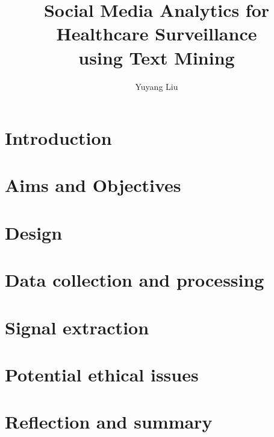 \documentclass[12pt]{report}
\begin{document}
\title{Social Media Analytics for Healthcare Surveillance \\using Text Mining}
\author{Yuyang Liu}
\normallinespacing
\maketitle

\tableofcontents %
\body
\chapter{Introduction} %

 
\chapter{Aims and Objectives}

 
\chapter{Design}


\chapter{Data collection and processing}


\chapter{Signal extraction}



\chapter{Potential ethical issues}


\chapter{Reflection and summary}




\end{document}

